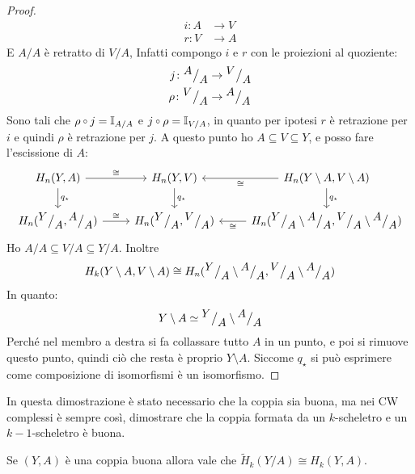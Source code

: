\begin{proof}
  \begin{align*}
    i \colon A & \to V \\
    r \colon V & \to A
  \end{align*}
  E $ {A} \slash {A} $ è retratto di $ {V} \slash {A} $,
  Infatti compongo $ i $ e $ r $ con le proiezioni al quoziente:
  \begin{align*}
    j \colon {^{\textstyle A}\big/_{\textstyle A}} & \to {^{\textstyle V}\big/_{\textstyle A}} \\
    \rho \colon {^{\textstyle V}\big/_{\textstyle A}} & \to {^{\textstyle A}\big/_{\textstyle A}}
  \end{align*}
  Sono tali che $ \rho \circ j = \Id{{A} \slash {A}} $ e $ j \circ \rho = \Id{{V} \slash {A}} $,
  in quanto per ipotesi $ r $ è retrazione per $ i $ e
  quindi $ \rho $ è retrazione per $ j $.
  A questo punto ho $ A \subseteq V \subseteq Y $, e posso fare l'escissione di $ A $:
  \[
    \begin{tikzcd}
      H_n(Y,A) \rar{\cong} \dar{q_\star} & H_n(Y,V)  \dar{q_\star}& H_n({Y} \setminus {A}, {V} \setminus {A}) \lar{\cong} \dar{q_\star} \\
      H_n(\quot{Y}{A}, \quot{A}{A}) \rar{\cong} & H_n(\quot{Y}{A}, \quot{V}{A}) & H_n(\quot{Y}{A} \setminus \quot{A}{A}, \quot{V}{A} \setminus \quot{A}{A}) \lar{\cong}
    \end{tikzcd}
  \]
  Ho $ {A} \slash {A} \subseteq {V} \slash {A} \subseteq {Y} \slash {A} $.
  Inoltre
  \[
    H_k(Y \setminus A, V \setminus A) \cong H_n({^{\textstyle Y}\big/_{\textstyle A}} \setminus {^{\textstyle A}\big/_{\textstyle A}}, {^{\textstyle V}\big/_{\textstyle A}} \setminus {^{\textstyle A}\big/_{\textstyle A}})
  \]
  In quanto:
  \[
    Y \setminus A \simeq {^{\textstyle Y}\big/_{\textstyle A}} \setminus {^{\textstyle A}\big/_{\textstyle A}}
  \]
  Perché nel membro a destra si fa collassare tutto $ A $ in un punto, e poi si
  rimuove questo punto, quindi ciò che resta è proprio $ Y \setminus A $. Siccome $ q_\star $
  si può esprimere come composizione di isomorfismi è un isomorfismo.
\end{proof}
  \begin{exercise}
    In questa dimostrazione è stato necessario che la coppia sia buona, ma nei
    CW complessi è sempre così, dimostrare che la coppia formata da un
    $ k $-scheletro e un $ k-1 $-scheletro è buona.
  \end{exercise}
\begin{corollary}
  Se $ (Y,A) $ è una coppia buona allora vale che $ \tilde{H}_k({Y} \slash {A}) \cong H_k(Y,A) $.
\end{corollary}


